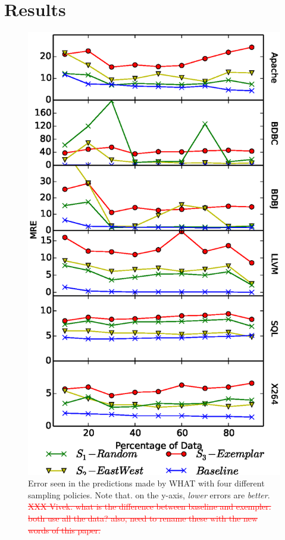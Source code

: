 \documentclass{sig-alternative}
\begin{document}
\section{Results}


\begin{figure}[!t]
\includegraphics[width=0.9\linewidth]{Figures/SamplingAccuracy.eps}
\caption{Error seen in the predictions made by WHAT with four different
sampling policies. Note that. on the y-axis,  {\em lower} errors are {\em better}. 
\textcolor{red}{\st{XXX Vivek. what is the difference between baseline and exempler. both use all the data?
also, need to rename these with the new words of this paper.}}}\label{fig:sampling_accuracy}
\end{figure}
\end{document}
